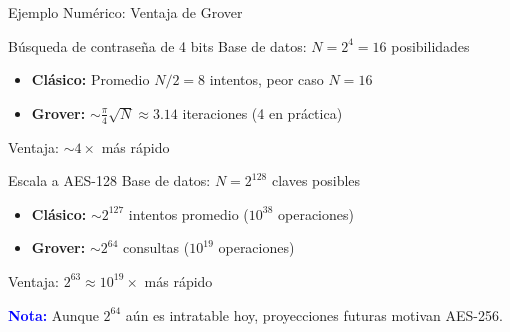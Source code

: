 \documentclass[aspectratio=169]{beamer}
\begin{document}
\begin{frame}{Ejemplo Numérico: Ventaja de Grover}
\small
\begin{exampleblock}{Búsqueda de contraseña de 4 bits}
Base de datos: $N = 2^4 = 16$ posibilidades
\begin{itemize}
\item \textbf{Clásico:} Promedio $N/2 = 8$ intentos, peor caso $N = 16$
\item \textbf{Grover:} $\sim \frac{\pi}{4}\sqrt{N} \approx 3.14$ iteraciones (4 en práctica)
\end{itemize}
Ventaja: $\sim 4\times$ más rápido
\end{exampleblock}

\vspace{0.15cm}
\begin{exampleblock}{Escala a AES-128}
Base de datos: $N = 2^{128}$ claves posibles
\begin{itemize}
\item \textbf{Clásico:} $\sim 2^{127}$ intentos promedio ($10^{38}$ operaciones)
\item \textbf{Grover:} $\sim 2^{64}$ consultas ($10^{19}$ operaciones)
\end{itemize}
Ventaja: $2^{63} \approx 10^{19}\times$ más rápido
\end{exampleblock}

\textcolor{blue}{\textbf{Nota:}} Aunque $2^{64}$ aún es intratable hoy, proyecciones futuras motivan AES-256.
\end{frame}
\end{document}
